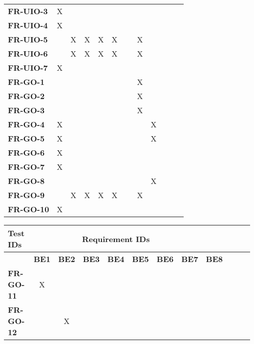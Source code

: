 \documentclass[12pt, titlepage]{article}
\begin{document}
\begin{table}[H]
\begin{adjustbox}{max width=0.7\paperwidth}
\begin{tabular}{l|ccccccccccc}
        \textbf{FR-UIO-3}  & X & ~ & ~ & ~ & ~ & ~ & ~ & ~\\
        \textbf{FR-UIO-4}  & X & ~ & ~ & ~ & ~ & ~ & ~ & ~\\
        \textbf{FR-UIO-5}  & ~ & X & X & X & X & ~ & X & ~\\
        \textbf{FR-UIO-6}  & ~ & X & X & X & X & ~ & X & ~\\
        \textbf{FR-UIO-7}  & X & ~ & ~ & ~ & ~ & ~ & ~ & ~\\
        \textbf{FR-GO-1}   & ~ & ~ & ~ & ~ & ~ & ~ & X & ~\\
        \textbf{FR-GO-2}   & ~ & ~ & ~ & ~ & ~ & ~ & X & ~\\
        \textbf{FR-GO-3}   & ~ & ~ & ~ & ~ & ~ & ~ & X & ~\\
        \textbf{FR-GO-4}   & X & ~ & ~ & ~ & ~ & ~ & ~ & X\\
        \textbf{FR-GO-5}   & X & ~ & ~ & ~ & ~ & ~ & ~ & X\\
        \textbf{FR-GO-6}   & X & ~ & ~ & ~ & ~ & ~ & ~ & ~\\
        \textbf{FR-GO-7}   & X & ~ & ~ & ~ & ~ & ~ & ~ & ~\\
        \textbf{FR-GO-8}   & ~ & ~ & ~ & ~ & ~ & ~ & ~ & X\\
        \textbf{FR-GO-9}   & ~ & X & X & X & X & ~ & X & ~\\
        \textbf{FR-GO-10}  & X & ~ & ~ & ~ & ~ & ~ & ~ & ~\\
    \end{tabular}
    \end{adjustbox}
\end{table}

\begin{table}[H]
    \centering
    \begin{adjustbox}{max width=0.7\paperwidth}
    \begin{tabular}{l|ccccccccccc}
        \textbf{Test IDs} & \multicolumn{7}{c}{\textbf{Requirement IDs}}\\
        \hline
        ~ & \textbf{BE1} & \textbf{BE2} & \textbf{BE3} & \textbf{BE4} & \textbf{BE5} & \textbf{BE6} & \textbf{BE7} & \textbf{BE8}\\
        \textbf{FR-GO-11}  & X & ~ & ~ & ~ & ~ & ~ & ~ & ~\\
        \textbf{FR-GO-12}  & ~ & X & ~ & ~ & ~ & ~ & ~ & ~\\
    \end{tabular}
    \end{adjustbox}
\end{table}
\end{document}
